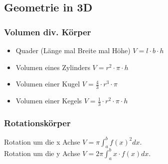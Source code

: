\subsection{Geometrie in 3D}
\subsubsection{Volumen div. Körper}
\begin{itemize}[leftmargin=*]
  \item Quader (Länge mal Breite mal Höhe) $V = l \cdot b \cdot h$
  \item Volumen eines Zylinders $V = r^2 \cdot \pi \cdot h$
  \item Volumen einer Kugel  $V = \frac{4}{3} \cdot r^3 \cdot \pi$
  \item Volumen einer Kegels  $V = \frac{1}{3} \cdot r^2 \cdot \pi \cdot h$
\end{itemize}
\subsubsection{Rotationskörper}
Rotation um die x Achse $V=\pi \int_a^b f(x)^2 dx.$\\
Rotation um die y Achse $V=2\pi \int_a^b x \cdot f(x) dx.$




